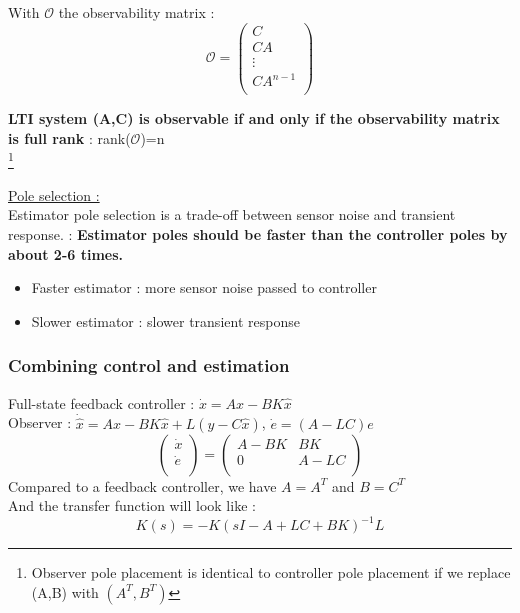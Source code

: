 \documentclass[../main.tex]{subfiles}
\begin{document}
With $\mathcal{O}$ the observability matrix : \begin{equation}
    \mathcal{O} = \begin{pmatrix}
        C \\ CA\\ \vdots \\ CA^{n-1}\\
    \end{pmatrix}
\end{equation}

\textbf{LTI system (A,C) is observable if and only if the observability matrix is full rank} : rank($\mathcal{O}$)=n\\

\footnote{Observer pole placement is identical to controller pole placement if we replace (A,B) with $(A^T, B^T)$}

\quad \underline{Pole selection :}\\
Estimator pole selection is a trade-off between sensor noise and transient response. : \textbf{Estimator poles should be faster than the controller poles by about 2-6 times.}\\
\begin{itemize}
    \item Faster estimator : more sensor noise passed to controller\\
    \item Slower estimator : slower transient response\\
\end{itemize}

\subsubsection{Combining control and estimation}

Full-state feedback controller : $\dot{x} = Ax-BK\hat{x}$\\
Observer : $\dot{\hat{x}} = A\hat{x} - BK\hat{x} + L(y-C\hat{x})$, $\dot{e} = (A-LC)e$\\

\begin{equation}
    \begin{pmatrix}
        \dot{x}\\ \dot{e}\\
    \end{pmatrix} = \begin{pmatrix}
        A-BK & BK\\
        0 & A-LC\\
    \end{pmatrix}
\end{equation}
Compared to a feedback controller, we have $A=A^T$ and $B=C^T$\\
And the transfer function will look like : \begin{equation}
    K(s) = -K(sI-A+LC+BK)^{-1}L
\end{equation}
\end{document}
